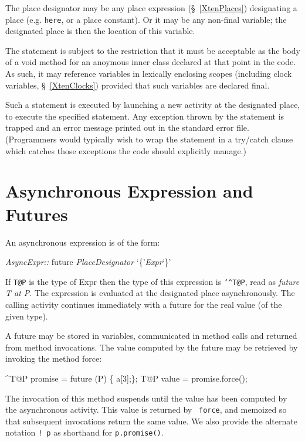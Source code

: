 The place designator may be any place expression (\S~\ref{XtenPlaces})
designating a place (e.g.{} {\tt here}, or a place constant). Or it
may be any non-final variable; the designated place is then the
location of this variable.

The statement is subject to the restriction that it must be acceptable
as the body of a {\cf void} method for an anoymous inner class
declared at that point in the code. As such, it may reference
variables in lexically enclosing scopes (including {\cf clock}
variables, \S~\ref{XtenClocks}) provided that such variables
are declared {\cf final}.


Such a statement is executed by launching a new activity at the
designated place, to execute the specified statement. Any exception
thrown by the statement is trapped and an error message printed out in
the standard error file. (Programmers would typically wish to wrap the 
statement in a {\cf try/catch} clause which catches those exceptions
the code should explicitly manage.)


\section{Asynchronous Expression and Futures}\label{XtenFutures}

An asynchronous expression is of the form:
\begin{x10}
 {\cf\em AsyncExpr::} 
    future {\cf\em{}PlaceDesignator} `\{'{\cf\em{}Expr}`\}' 
\end{x10} 
\def\Hat{{\tt \char`\^}}
If {\tt T@P} is the type of {\cf Expr} then the type of this
expression is {\tt\Hat T@P}, read as {\em future {\cf T} at {\cf P}}.
The expression is evaluated at the designated place
asynchronously. The calling activity continues immediately with a 
future for the real value (of the given type). 

A future may be stored in variables, communicated in
method calls and returned from method invocations. The value computed
by the future may be retrieved by invoking the method {\cf force}:

\begin{x10}
 ^T@P promise = future (P) \{ a[3];\};
 T@P value = promise.force();
\end{x10}
The invocation of this method suspends until the value has been
computed by the asynchronous activity. This value is returned by {\tt
force}, and memoized so that subsequent invocations return the same
value. We also provide the alternate notation {\tt ! p} 
as shorthand for {\tt p.promise()}.

